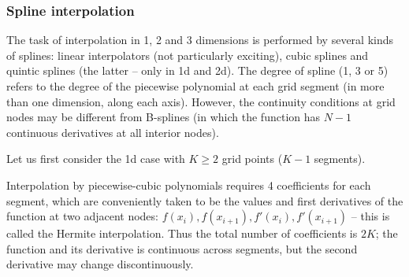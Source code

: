 \documentclass[12pt]{article}
\begin{document}
\subsubsection{Spline interpolation}  \label{sec:MathSplineDetails}

The task of interpolation in 1, 2 and 3 dimensions is performed by several kinds of splines: linear interpolators (not particularly exciting), cubic splines and quintic splines (the latter -- only in 1d and 2d). The degree of spline (1, 3 or 5) refers to the degree of the piecewise polynomial at each grid segment (in more than one dimension, along each axis). However, the continuity conditions at grid nodes may be different from B-splines (in which the function has $N-1$ continuous derivatives at all interior nodes).

Let us first consider the 1d case with $K\ge 2$ grid points ($K-1$ segments).

Interpolation by piecewise-cubic polynomials requires 4 coefficients for each segment, which are conveniently taken to be the values and first derivatives of the function at two adjacent nodes: $f(x_i), f(x_{i+1}), f'(x_i), f'(x_{i+1})$ -- this is called the Hermite interpolation. Thus the total number of coefficients is $2K$; the function and its derivative is continuous across segments, but the second derivative may change discontinuously.
\end{document}
